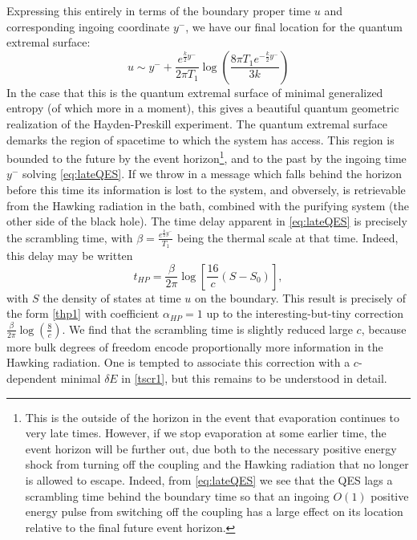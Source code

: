 \documentclass[12pt]{article}
\begin{document}
Expressing this  entirely in terms of the boundary proper time $u$ and corresponding ingoing coordinate $y^-$, we have our final location for the quantum extremal surface:
\begin{equation}\label{eq:lateQES}
	u \sim y^- + \frac{e^{\frac{k}{2}y^-}}{2\pi T_1 }\log\left(\frac{8 \pi T_1 e^{-\frac{k}{2}y^-}}{3k}\right)
\end{equation}
In the case that this is the quantum extremal surface of minimal generalized entropy (of which more in a moment), this gives a beautiful quantum geometric realization of the Hayden-Preskill experiment. The quantum extremal surface demarks the region of spacetime to which the system has access. This region is bounded to the future by the event horizon\footnote{This is the outside of the horizon in the event that evaporation continues to very late times.  However, if we stop evaporation at some earlier time, the event horizon will be further out, due both to the necessary positive energy shock from turning off the coupling and the Hawking radiation that no longer is allowed to escape. Indeed, from \eqref{eq:lateQES} we see that the QES lags a scrambling time behind the boundary time so that an ingoing $O(1)$ positive energy pulse from switching off the coupling has a large effect on its location relative to the final future event horizon.}, and to the past by the ingoing time $y^-$ solving \eqref{eq:lateQES}. If we throw in a message which falls behind the horizon before this time its information is lost to the system, and obversely, is retrievable from the Hawking radiation in the bath, combined with the purifying system (the other side of the black hole). The time delay apparent in \eqref{eq:lateQES} is precisely the scrambling time, with $\beta = \frac{e^{\frac{k}{2}y^-}}{T_1 }$ being the thermal scale at that time. Indeed, this delay may be written
\begin{equation}
\label{eq:tHPdelay}
t_{HP} = \frac{\beta}{2\pi} \log \left[\frac{16}{c}(S-S_0) \right],
\end{equation}
with $S$ the density of states at time $u$ on the boundary.  This result is precisely of the form \eqref{thp1} with coefficient $\alpha_{HP}=1$ up to the interesting-but-tiny correction $\frac{\beta}{2\pi} \log \left(\frac{8}{c}\right)$.
We find that the scrambling time is slightly reduced large $c$, because more bulk degrees of freedom encode proportionally more information in the Hawking radiation.  One is tempted to associate this correction with a $c$-dependent minimal $\delta E$ in \eqref{tscr1}, but this remains to be understood in detail.
\end{document}

